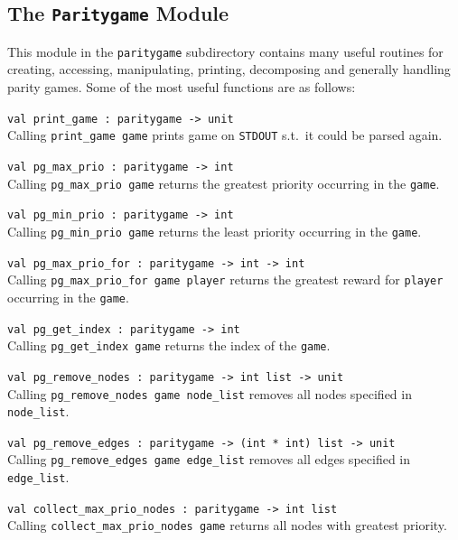 \subsection{The {\tt Paritygame} Module}

This module in the \texttt{paritygame} subdirectory contains many useful routines for creating, accessing,
manipulating, printing, decomposing and generally handling parity games. Some of the most useful functions
are as follows:

\begin{description}
\itemsep3mm
\item \verb+val print_game : paritygame -> unit+ \ \\
Calling \verb+print_game game+ prints game on \texttt{STDOUT} s.t.\ it could be parsed again.

\item \verb+val pg_max_prio : paritygame -> int+ \ \\
Calling \verb+pg_max_prio game+ returns the greatest priority occurring in the \verb+game+.

\item \verb+val pg_min_prio : paritygame -> int+ \ \\
Calling \verb+pg_min_prio game+ returns the least priority occurring in the \verb+game+.

\item \verb+val pg_max_prio_for : paritygame -> int -> int+ \ \\
Calling \verb+pg_max_prio_for game player+ returns the greatest reward for \verb+player+ occurring in the \verb+game+.

\item \verb+val pg_get_index : paritygame -> int+ \ \\
Calling \verb+pg_get_index game+ returns the index of the \verb+game+.

\item \verb+val pg_remove_nodes : paritygame -> int list -> unit+ \ \\
Calling \verb+pg_remove_nodes game node_list+ removes all nodes specified in \verb+node_list+.

\item \verb+val pg_remove_edges : paritygame -> (int * int) list -> unit+ \ \\
Calling \verb+pg_remove_edges game edge_list+ removes all edges specified in \verb+edge_list+.

\item \verb+val collect_max_prio_nodes : paritygame -> int list+ \ \\
Calling \verb+collect_max_prio_nodes game+ returns all nodes with greatest priority.


\end{description}
